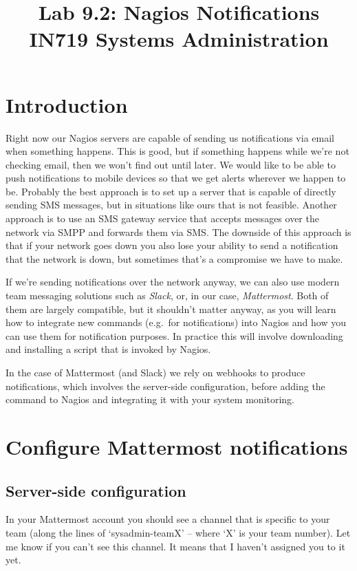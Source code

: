 \documentclass{article}   	%
\title{Lab 9.2:  Nagios Notifications\\ IN719 Systems Administration}
\date{}							%
\begin{document}
\maketitle

\section*{Introduction}
Right now our Nagios servers are capable of sending us notifications via email when something happens.  This is good, but if something happens while we're not checking email, then we won't find out until later.  We would like to be able to push notifications to mobile devices so that we get alerts wherever we happen to be.  Probably the best approach is to set up a server that is capable of directly sending SMS messages, but in situations like ours that is not feasible.  Another approach is to use an SMS gateway service that accepts messages over the network via SMPP and forwards them via SMS.  The downside of this approach is that if your network goes down you also lose your ability to send a notification that the network is down, but sometimes that's a compromise we have to make.

If we're sending notifications over the network anyway, we can also use modern team messaging solutions such as \emph{Slack}, or, in our case, \emph{Mattermost}. Both of them are largely compatible, but it shouldn't matter anyway, as you will learn how to integrate new commands (e.g.~for notifications) into Nagios and how you can use them for notification purposes. In practice this will involve downloading and installing a script that is invoked by Nagios.

In the case of Mattermost (and Slack) we rely on webhooks to produce notifications, which involves the server-side configuration, before adding the command to Nagios and integrating it with your system monitoring.

\section{Configure Mattermost notifications}

\subsection{Server-side configuration}

In your Mattermost account you should see a channel that is specific to your team (along the lines of `sysadmin-teamX' -- where `X' is your team number). Let me know if you can't see this channel. It means that I haven't assigned you to it yet.
\end{document}

